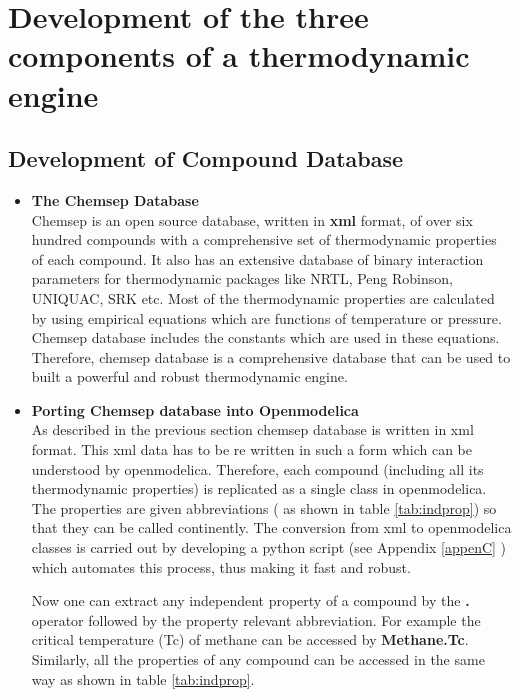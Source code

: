 \documentclass[12pt]{report}
\begin{document}
\section{Development of the three components of a thermodynamic engine}
\subsection{Development of Compound Database}
\begin{itemize}
\item {\textbf{The Chemsep Database}} \\
Chemsep is an open source database, written in \textbf{xml} format, of over six hundred compounds with a comprehensive set of thermodynamic properties of each compound. It also has an extensive database of binary interaction parameters for thermodynamic packages like NRTL, Peng Robinson, UNIQUAC, SRK etc. Most of the thermodynamic properties are calculated by using empirical equations which are functions of temperature or pressure. Chemsep database includes the constants which are used in these equations. Therefore, chemsep database is a comprehensive database that can be used to built a powerful and robust thermodynamic engine.

\item{\textbf{Porting Chemsep database into Openmodelica}} \\
As described in the previous section chemsep database is written in xml format. This xml data has to be re written in such a form which can be understood by openmodelica. Therefore, each compound (including all its thermodynamic properties) is replicated as a single class in openmodelica. The properties are given abbreviations ( as shown in table \ref{tab:indprop}) so that they can be called continently. The conversion from xml to openmodelica classes is carried out by developing a python script (see Appendix \ref{appenC} ) which automates this process, thus making it fast and robust. 

Now one can extract any independent property of a compound by the \textbf{.} operator followed by the property relevant abbreviation. For example the critical temperature (Tc) of methane can be accessed by \textbf{Methane.Tc}. Similarly, all the properties of any compound can be accessed in the same way as shown in table \ref{tab:indprop}. \\
\end{itemize}
\end{document}
